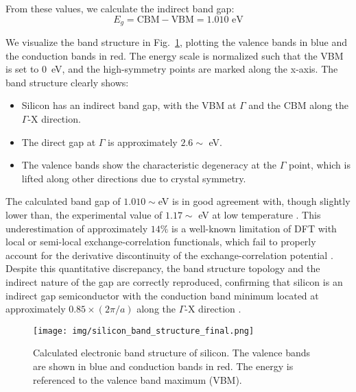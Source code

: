 \documentclass{article}
\begin{document}
From these values, we calculate the indirect band gap:
\begin{equation}
E_g = \text{CBM} - \text{VBM} = 1.010 \text{ eV}
\end{equation}

We visualize the band structure in Fig.~\ref{fig:band_structure}, plotting the valence bands in blue and the conduction bands in red. The energy scale is normalized such that the VBM is set to $0$~eV, and the high-symmetry points are marked along the x-axis. The band structure clearly shows:
\begin{itemize}
    \item Silicon has an indirect band gap, with the VBM at $\Gamma$ and the CBM along the $\Gamma$-X direction.
    \item The direct gap at $\Gamma$ is approximately $2.6\sim$ eV.
    \item The valence bands show the characteristic degeneracy at the $\Gamma$ point, which is lifted along other directions due to crystal symmetry.
\end{itemize}

The calculated band gap of $1.010\sim$eV is in good agreement with, though slightly lower than, the experimental value of $1.17\sim$ eV at low temperature \cite{green1990}. This underestimation of approximately $14\%$ is a well-known limitation of DFT with local or semi-local exchange-correlation functionals, which fail to properly account for the derivative discontinuity of the exchange-correlation potential \cite{perdew2017}. Despite this quantitative discrepancy, the band structure topology and the indirect nature of the gap are correctly reproduced, confirming that silicon is an indirect gap semiconductor with the conduction band minimum located at approximately $0.85\times(2\pi/a)$ along the $\Gamma$-X direction \cite{chelikowsky1976}.

\begin{figure}[h!]
    \centering
    \texttt{[image: img/silicon\_band\_structure\_final.png]} %
    \caption{Calculated electronic band structure of silicon. The valence bands are shown in blue and conduction bands in red. The energy is referenced to the valence band maximum (VBM).}
    \label{fig:band_structure}
\end{figure}


\end{document}

